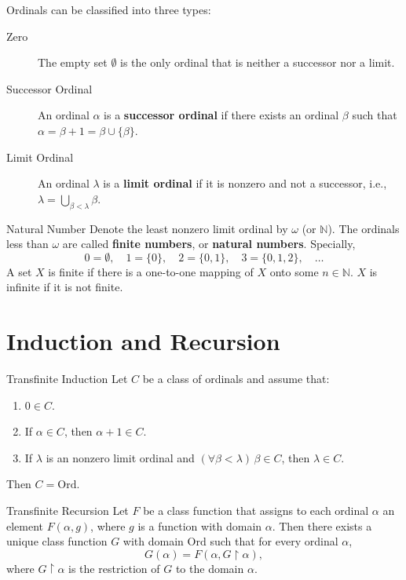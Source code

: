 Ordinals can be classified into three types:
\begin{description}
    \item[Zero] The empty set \(\emptyset\) is the only ordinal that is neither a successor nor a limit.
    \item[Successor Ordinal] An ordinal \(\alpha\) is a \textbf{successor ordinal} 
        if there exists an ordinal \(\beta\) such that \(\alpha = \beta + 1 = \beta \cup \{\beta\}\).
    \item[Limit Ordinal] An ordinal \(\lambda\) is a \textbf{limit ordinal} 
        if it is nonzero and not a successor, i.e., \(\lambda = \bigcup_{\beta < \lambda} \beta\).
\end{description}


\begin{definition}{Natural Number} %
    Denote the least nonzero limit ordinal by \(\omega\) (or \(\mathbb{N}\)).
    The ordinals less than \(\omega\) are called \textbf{finite numbers}, or \textbf{natural numbers}.
    Specially,
    \[
        0 = \emptyset, \quad 1 = \{0\}, \quad 2 = \{0, 1\}, \quad 3 = \{0, 1, 2\}, \quad \ldots
    \]
    A set \(X\) is finite if there is a one-to-one mapping of \(X\) onto some \(n\in \mathbb{N}\).
    \(X\) is infinite if it is not finite.
\end{definition}

\section{Induction and Recursion} %
\begin{theorem}{Transfinite Induction} %
    Let \(C\) be a class of ordinals and assume that:
    \begin{enumerate}[label=(\roman*)]
        \item \(0 \in C\).
        \item If \(\alpha \in C\), then \(\alpha + 1 \in C\).
        \item If \(\lambda\) is an nonzero limit ordinal and \((\forall \beta < \lambda)\, \beta \in C\), 
            then \(\lambda \in C\).
    \end{enumerate}
    Then \(C = \mathrm{Ord}\).
\end{theorem}

\begin{theorem}{Transfinite Recursion} %
    Let \(F\) be a class function that assigns to each ordinal \(\alpha\) 
    an element \(F(\alpha, g)\), where \(g\) is a function with domain \(\alpha\).
    Then there exists a unique class function \(G\) with domain \(\mathrm{Ord}\) 
    such that for every ordinal \(\alpha\),
    \[
        G(\alpha) = F(\alpha, G \upharpoonright \alpha),
    \]
    where \(G \upharpoonright \alpha\) is the restriction of \(G\) to the domain \(\alpha\).
\end{theorem}

